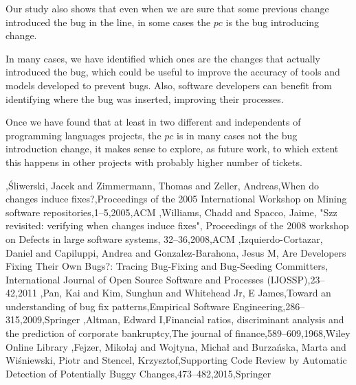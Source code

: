 \documentclass[conference]{IEEEtran}
\begin{document}
Our study also shows that even when we are sure that some previous change introduced the bug in the line, in some cases the $pc$ is the bug introducing change. %

In many cases, we have identified which ones are the changes that actually introduced the bug, which could be useful to improve the accuracy of tools and models developed to prevent bugs. Also, software developers can benefit from identifying where the bug was inserted, improving their processes.

Once we have found that at least in two different and independents of programming languages projects, the $pc$ is in many cases not the bug introduction change, it makes sense to explore, as future work, to which extent this happens in other projects with probably higher number of tickets.


\begin{thebibliography}{1}

,{\'S}liwerski, Jacek and Zimmermann, Thomas and Zeller, Andreas,When do changes induce fixes?,Proceedings of the 2005 International Workshop on Mining software repositories,1--5,2005,ACM
,Williams, Chadd and Spacco, Jaime, "Szz revisited: verifying when changes induce fixes", Proceedings of the 2008 workshop on Defects in large software systems, 32--36,2008,ACM
,Izquierdo-Cortazar, Daniel and Capiluppi, Andrea and Gonzalez-Barahona, Jesus M, Are Developers Fixing Their Own Bugs?: Tracing Bug-Fixing and Bug-Seeding Committers,
  International Journal of Open Source Software and Processes (IJOSSP),23--42,2011
,Pan, Kai and Kim, Sunghun and Whitehead Jr, E James,Toward an understanding of bug fix patterns,Empirical Software Engineering,286--315,2009,Springer
,Altman, Edward I,Financial ratios, discriminant analysis and the prediction of corporate bankruptcy,The journal of finance,589--609,1968,Wiley Online Library
,Fejzer, Miko{\l}aj and Wojtyna, Micha{\l} and Burza{\'n}ska, Marta and Wi{\'s}niewski, Piotr and Stencel, Krzysztof,Supporting Code Review by Automatic Detection of Potentially Buggy Changes,473--482,2015,Springer
\end{thebibliography}




\end{document}
